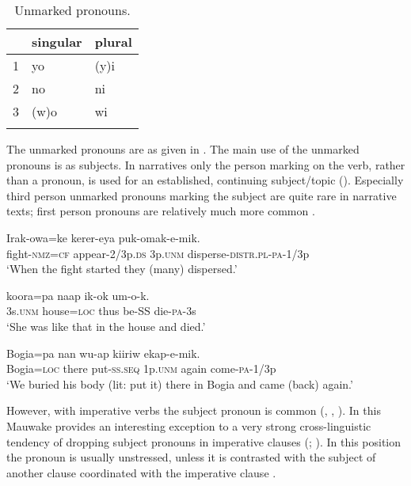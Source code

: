 \begin{table}[h]
 \caption{Unmarked pronouns.}
\label{tab:3:unmarkedpronouns}

\begin{tabular}{lll}
\mytoprule
 &singular &plural\\
\midrule
1 &yo &(y)i\\
2 &no &ni\\
3 &(w)o &wi\\
\mybottomrule 
\end{tabular}
\end{table}

The unmarked pronouns are as given in .
The main use of the unmarked pronouns is as subjects. In narratives only the person marking on the verb, rather than a pronoun, is used for an established, continuing subject/topic (). Especially third person unmarked pronouns marking the subject are quite rare in narrative texts; first person pronouns are relatively much more common \citep[79--80]{Jarvinen1991}. 

\ea 
\gll Irak-owa=ke kerer-eya   puk-omak-e-mik.\\
fight-\textsc{nmz}=\textsc{cf} appear-2/3p.\textsc{ds} 3p.\textsc{unm} disperse-\textsc{distr}.\textsc{pl}-\textsc{pa}-1/3p\\
\glt`When the fight started they (many) dispersed.'
\z

\ea%
\label{ex:3:x534}
\gll {} koora=pa naap ik-ok um-o-k. \\
3s.\textsc{unm} house=\textsc{loc} thus be-SS die-\textsc{pa}-3s\\
\glt`She was like that in the house and died.'
\z

\ea%
\label{ex:3:x1803}
\gll Bogia=pa nan wu-ap  kiiriw ekap-e-mik. \\
Bogia=\textsc{loc} there put-\textsc{ss}.\textsc{seq} 1p.\textsc{unm} again come-\textsc{pa}-1/3p\\
\glt`We buried his body (lit: put it) there in Bogia and came (back) again.'
\z

However, with imperative verbs the subject pronoun is common (, , ). In this Mauwake provides an interesting exception to a very strong cross-linguistic tendency of dropping subject pronouns in imperative clauses (\citealt[80]{Givon1979}; \citealt[173--174]{SadockEtAl1985}). In this position the pronoun is usually unstressed, unless it is contrasted with the subject of another clause coordinated with the imperative clause . 

